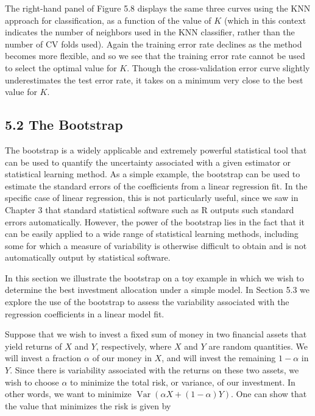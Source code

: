 \documentclass[10pt]{article}
\begin{document}
The right-hand panel of Figure 5.8 displays the same three curves using the KNN approach for classification, as a function of the value of $K$ (which in this context indicates the number of neighbors used in the KNN classifier, rather than the number of CV folds used). Again the training error rate declines as the method becomes more flexible, and so we see that the training error rate cannot be used to select the optimal value for $K$. Though the cross-validation error curve slightly underestimates the test error rate, it takes on a minimum very close to the best value for $K$.


\subsection*{5.2 The Bootstrap}
The bootstrap is a widely applicable and extremely powerful statistical tool that can be used to quantify the uncertainty associated with a given estimator or statistical learning method. As a simple example, the bootstrap can be used to estimate the standard errors of the coefficients from a linear regression fit. In the specific case of linear regression, this is not particularly useful, since we saw in Chapter 3 that standard statistical software such as R outputs such standard errors automatically. However, the power of the bootstrap lies in the fact that it can be easily applied to a wide range of statistical learning methods, including some for which a measure of variability is otherwise difficult to obtain and is not automatically output by statistical software.

In this section we illustrate the bootstrap on a toy example in which we wish to determine the best investment allocation under a simple model. In Section 5.3 we explore the use of the bootstrap to assess the variability associated with the regression coefficients in a linear model fit.

Suppose that we wish to invest a fixed sum of money in two financial assets that yield returns of $X$ and $Y$, respectively, where $X$ and $Y$ are random quantities. We will invest a fraction $\alpha$ of our money in $X$, and will invest the remaining $1-\alpha$ in $Y$. Since there is variability associated with the returns on these two assets, we wish to choose $\alpha$ to minimize the total risk, or variance, of our investment. In other words, we want to minimize $\operatorname{Var}(\alpha X+(1-\alpha) Y)$. One can show that the value that minimizes the risk is given by
\end{document}
